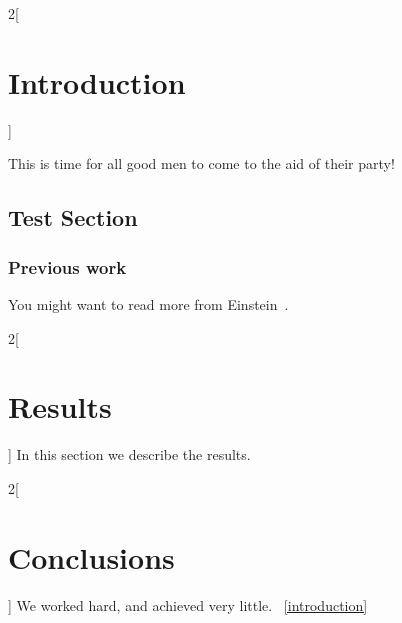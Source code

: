 \documentclass[a4paper, 11pt, oneside]{thesis/HSR}  %
\begin{document}

  \mainmatter    %
  \pagestyle{fancy}  %









  \begin{multicols}{2}[\chapter{Introduction}]
    \label{introduction}

    This is time for all good men to come to the aid of their party!

    \section{Test Section}\label{test section}
    \Blindtext
    \Blindtext
    \Blindtext

    \subsection{Previous work}\label{previous work}
    You might want to read more from Einstein~\cite{Einstein}.
  \end{multicols}

  \begin{multicols}{2}[\chapter{Results}]
    \label{results}
    In this section we describe the results.
    \Blindtext
  \end{multicols}

  \begin{multicols}{2}[\chapter{Conclusions}]
    \label{conclusions}
    We worked hard, and achieved very little.
    ~\ref{introduction}
    \Blindtext
  \end{multicols}
\end{document}
